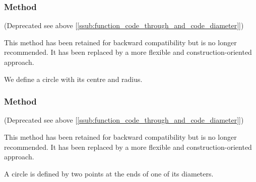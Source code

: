 \subsubsection{Method }
\label{ssub:method_circle_radius}

(Deprecated see above [\ref{ssub:function_code_through_and_code_diameter}])

This method has been retained for backward compatibility but is no longer recommended. It has been replaced by a more flexible and construction-oriented approach.

We define a circle with its centre and radius.

\vspace{1em}
\begin{tkzexample}[latex=.5\textwidth]
\begin{center}
\end{center}
\end{tkzexample}

\subsubsection{Method }
\label{ssub:method_circle_diameter}

(Deprecated see above [\ref{ssub:function_code_through_and_code_diameter}])

This method has been retained for backward compatibility but is no longer recommended. It has been replaced by a more flexible and construction-oriented approach.

A circle is defined by two points at the ends of one of its diameters.

\vspace{1em}
\begin{tkzexample}[latex=.5\textwidth]
\begin{center}
\end{center}
\end{tkzexample}


